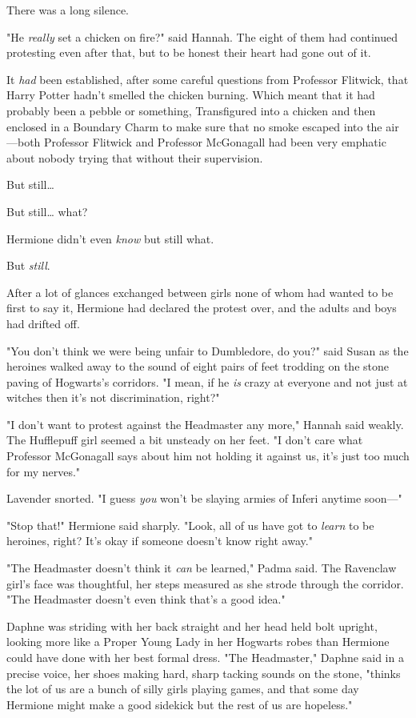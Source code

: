 There was a long silence.

"He \emph{really} set a chicken on fire?" said Hannah.
\later
The eight of them had continued protesting even after that, but to be honest
their heart had gone out of it.

It \emph{had} been established, after some careful questions from Professor
Flitwick, that Harry Potter hadn't smelled the chicken burning. Which meant
that it had probably been a pebble or something, Transfigured into a chicken
and then enclosed in a Boundary Charm to make sure that no smoke escaped into
the air---both Professor Flitwick and Professor McGonagall had been very
emphatic about nobody trying that without their supervision.

But still{\ldots}

But still{\ldots} what?

Hermione didn't even \emph{know} but still what.

But \emph{still}.

After a lot of glances exchanged between girls none of whom had wanted to be
first to say it, Hermione had declared the protest over, and the adults and
boys had drifted off.

"You don't think we were being unfair to Dumbledore, do you?" said Susan as the
heroines walked away to the sound of eight pairs of feet trodding on the stone
paving of Hogwarts's corridors. "I mean, if he \emph{is} crazy at everyone and
not just at witches then it's not discrimination, right?"

"I don't want to protest against the Headmaster any more," Hannah said weakly.
The Hufflepuff girl seemed a bit unsteady on her feet. "I don't care what
Professor McGonagall says about him not holding it against us, it's just too
much for my nerves."

Lavender snorted. "I guess \emph{you} won't be slaying armies of Inferi anytime
soon---"

"Stop that!" Hermione said sharply. "Look, all of us have got to \emph{learn}
to be heroines, right? It's okay if someone doesn't know right away."

"The Headmaster doesn't think it \emph{can} be learned," Padma said. The
Ravenclaw girl's face was thoughtful, her steps measured as she strode through
the corridor. "The Headmaster doesn't even think that's a good idea."

Daphne was striding with her back straight and her head held bolt upright,
looking more like a Proper Young Lady in her Hogwarts robes than Hermione could
have done with her best formal dress. "The Headmaster," Daphne said in a
precise voice, her shoes making hard, sharp tacking sounds on the stone,
"thinks the lot of us are a bunch of silly girls playing games, and that
some day Hermione might make a good sidekick but the rest of us are hopeless."

